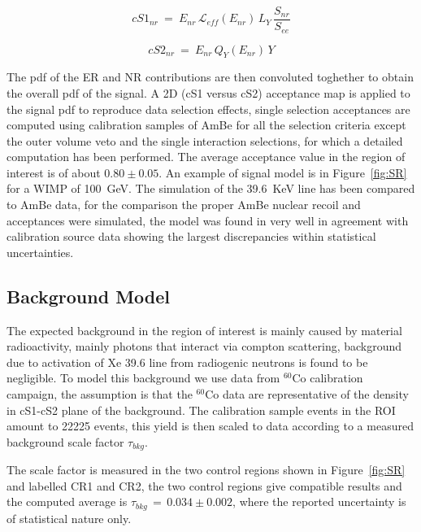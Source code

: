 \begin{equation}
cS1_{nr} ~=~ E_{nr} \, \mathcal{L}_{eff}(E_{nr}) \, L_{Y} \, \frac{S_{nr}}{S_{ee}}
\label{f:cs1}
\end{equation}

\begin{equation}
cS2_{nr}  ~ = ~ E_{nr} \, Q_{Y}(E_{nr}) \, Y
\label{f:cs2}
\end{equation}

The pdf of the ER and NR contributions are then convoluted toghether to obtain the overall pdf of the signal.
A 2D (cS1 versus cS2) acceptance map is applied to the signal pdf to reproduce data selection effects, single selection acceptances
are computed using calibration samples of AmBe for all the selection criteria except the outer volume veto and the single interaction selections, 
for which a detailed computation has been performed. The average acceptance value in the region of interest is of about $0.80 \pm 0.05$. 
An example of signal model is in Figure~\ref{fig:SR} for a WIMP of 100~GeV. 
The simulation of the 39.6~KeV line has been compared to AmBe data, for the comparison the proper AmBe nuclear recoil and acceptances
were simulated, the model was found in very well in agreement with calibration source data showing the largest discrepancies within 
statistical uncertainties.





\subsection {Background Model}

The expected background in the region of interest is mainly caused by material radioactivity, mainly photons that 
interact via compton scattering, background due to activation of Xe 39.6 line from radiogenic neutrons is found to be negligible.
To model this background we use data from $^{60}$Co calibration campaign, the assumption is
that the $^{60}$Co data are representative of the density in cS1-cS2 plane of the background. The calibration sample events
in the ROI amount to  22225 events, this yield is then scaled to data according to a measured background scale factor $\tau_{bkg}$.

The scale factor is measured in the two control regions shown in Figure~\ref{fig:SR} and labelled CR1 and CR2, the two control 
regions give compatible results and the computed average is $\tau_{bkg} \, =  \, 0.034 \pm 0.002 $, where the reported uncertainty 
is of statistical nature only.

